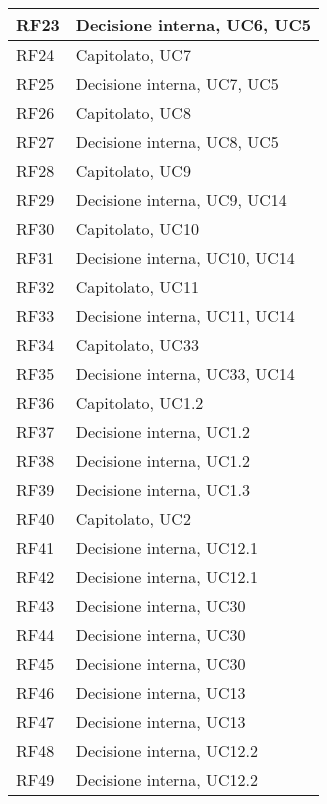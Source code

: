 \begin{center}
\begin{longtable}{|C{5cm}|C{5cm}|}
        \hline
        RF23 & Decisione interna, UC6, UC5 \\
        \hline
        RF24 & Capitolato, UC7 \\
        \hline
        RF25 & Decisione interna, UC7, UC5 \\
        \hline
        RF26 & Capitolato, UC8 \\
        \hline
        RF27 & Decisione interna, UC8, UC5 \\
        \hline
        RF28 & Capitolato, UC9 \\
        \hline
        RF29 & Decisione interna, UC9, UC14 \\
        \hline
        RF30 & Capitolato, UC10 \\
        \hline
        RF31 & Decisione interna, UC10, UC14 \\
        \hline
        RF32 & Capitolato, UC11 \\
        \hline
        RF33 & Decisione interna, UC11, UC14 \\
        \hline
        RF34 & Capitolato, UC33 \\
        \hline
        RF35 & Decisione interna, UC33, UC14 \\
        \hline
        RF36 & Capitolato, UC1.2 \\
        \hline
        RF37 & Decisione interna, UC1.2 \\
        \hline
        RF38 & Decisione interna, UC1.2 \\
        \hline
        RF39 & Decisione interna, UC1.3 \\
        \hline
        RF40 & Capitolato, UC2 \\
        \hline
        RF41 & Decisione interna, UC12.1 \\
        \hline
        RF42 & Decisione interna, UC12.1 \\
        \hline
        RF43 & Decisione interna, UC30 \\
        \hline
        RF44 & Decisione interna, UC30 \\
        \hline
        RF45 & Decisione interna, UC30 \\
        \hline
        RF46 & Decisione interna, UC13 \\
        \hline
        RF47 & Decisione interna, UC13 \\
        \hline
        RF48 & Decisione interna, UC12.2 \\
        \hline
        RF49 & Decisione interna, UC12.2 \\

\end{longtable}
\end{center}
